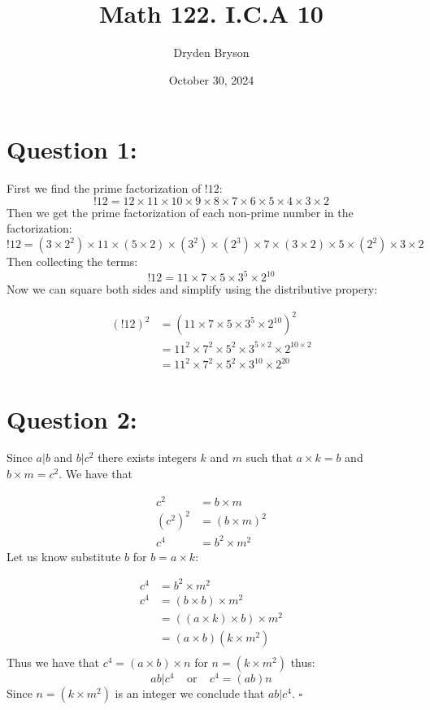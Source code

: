 \documentclass{article}
\title{Math 122. I.C.A 10}
\author{Dryden Bryson}
\date{October 30, 2024}
\begin{document}
\maketitle
\newpage
\section*{Question 1:}
First we find the prime factorization of $!12$:
$$!12 = 12 \times11 \times10 \times9 \times8 \times7 \times6 \times5 \times4 \times3 \times2$$
Then we get the prime factorization of each non-prime number in the factorization:
$$!12 = (3 \times 2^{2})\times 11\times (5\times 2) \times (3^{2})\times (2^{3})\times 7\times (3\times 2)\times 5\times (2^{2})\times 3\times 2$$
Then collecting the terms: 
$$!12 = 11\times 7 \times 5 \times 3^{5}\times 2^{10}$$
Now we can square both sides and simplify using the distributive propery:

$$\begin{aligned}
    (!12)^{2} &= (11\times 7 \times 5 \times 3^{5}\times 2^{10})^{2}\\
     &= 11^{2}\times 7^{2} \times 5^{2} \times 3^{5\times 2}\times 2^{10\times 2}\\
     &= 11^{2}\times 7^{2} \times 5^{2} \times 3^{10}\times 2^{20}
\end{aligned}$$

\section*{Question 2:}
Since $a\vert b$ and $b\vert c^{2}$ there exists integers $k$ and $m$ such that $a\times k = b$ and $b\times m = c^{2}$.
We have that 

$$\begin{aligned}
    c^{2}&=b\times m  \\ 
    \left( c^{2} \right)^{2}&=(b\times m)^{2} \\
    c^{4} &= b^{2} \times  m^{2}
\end{aligned}$$
Let us know substitute $b$ for $b=a\times k$:

$$\begin{aligned}
    c^{4} &= b^{2}\times m^{2}\\
    c^{4} &= (b\times b)\times m^{2}\\
     &= \left(  (a\times k)\times  b\right) \times m^{2}\\
     &= (a\times b)(k\times m^{2})\\
\end{aligned}$$Thus we have that $c^{4}=(a\times b)\times n$ for $n=(k\times m^{2})$ thus: $$ab\vert c^{4}\;\;\;\;\text{or}\;\;\;\;c^{4}=(ab)n$$
Since $n=(k\times m^{2})$ is an integer we conclude that $ab\vert c^{4}$. $\square$ 
\newpage
\end{document}
